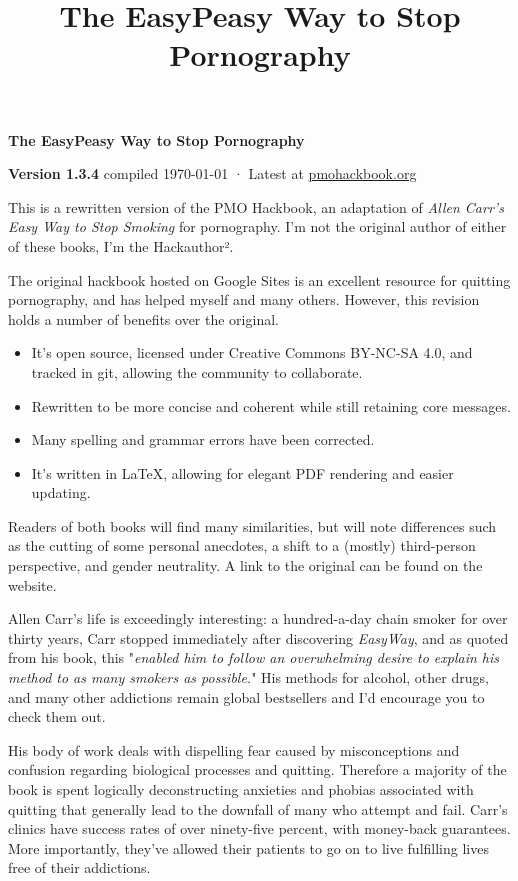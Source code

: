 \documentclass[easypeasy.tex]{subfiles}
\title {The EasyPeasy Way to Stop Pornography}
\begin{document}
\thispagestyle{empty}

\begin{center}
  {\Huge\bfseries The EasyPeasy Way to Stop Pornography \par}
  {\small \textbf{Version 1.3.4} compiled {\today} · Latest at \href{https://pmohackbook.org}{pmohackbook.org}}
\end{center}

This is a rewritten version of the PMO Hackbook, an adaptation of \textit{Allen Carr's Easy Way to Stop Smoking} for pornography. I'm not the original author of either of these books, I'm the Hackauthor².

The original hackbook hosted on Google Sites is an excellent resource for quitting pornography, and has helped myself and many others. However, this revision holds a number of benefits over the original.
\begin{itemize}
\item It's open source, licensed under Creative Commons BY-NC-SA 4.0, and tracked in git, allowing the community to collaborate.
\item Rewritten to be more concise and coherent while still retaining core messages.
\item Many spelling and grammar errors have been corrected.
\item It's written in LaTeX, allowing for elegant PDF rendering and easier updating.
\end{itemize}

Readers of both books will find many similarities, but will note differences such as the cutting of some personal anecdotes, a shift to a (mostly) third-person perspective, and gender neutrality. A link to the original can be found on the website.

Allen Carr's life is exceedingly interesting: a hundred-a-day chain smoker for over thirty years, Carr stopped immediately after discovering \textit{EasyWay}, and as quoted from his book, this "\textit{enabled him to follow an overwhelming desire to explain his method to as many smokers as possible.}" His methods for alcohol, other drugs, and many other addictions remain global bestsellers and I'd encourage you to check them out.

His body of work deals with dispelling fear caused by misconceptions and confusion regarding biological processes and quitting. Therefore a majority of the book is spent logically deconstructing anxieties and phobias associated with quitting that generally lead to the downfall of many who attempt and fail. Carr's clinics have success rates of over ninety-five percent, with money-back guarantees. More importantly, they've allowed their patients to go on to live fulfilling lives free of their addictions.
\end{document}

